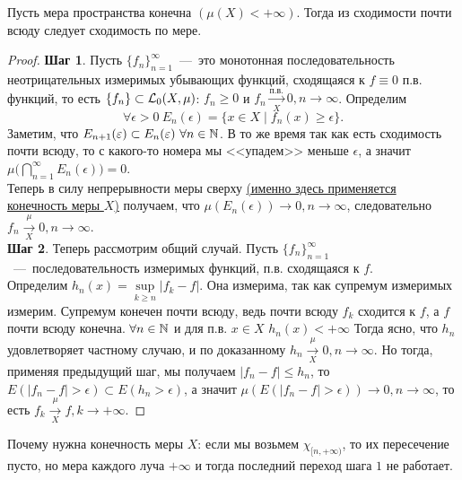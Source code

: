 \begin{theorem}[Лебега]
    Пусть мера пространства конечна $\left(\mu (X) < +\infty\right)$. Тогда из сходимости почти всюду следует сходимость по мере.
\end{theorem}
\begin{proof}
     \textbf{Шаг 1}. Пусть $\{f_n\}_{n = 1}^\infty$~---~это монотонная последовательность неотрицательных измеримых убывающих функций, сходящаяся к $f \equiv 0$ п.в. функций, то есть $\{ f_n \} \subset \mathcal{L}_0 (X, \mu)$: $f_n \geq 0$ и $f_n \xrightarrow[X]{\text{п.в.}}0, n \xrightarrow{} \infty$.
     Определим $$\forall \epsilon > 0 \ E_n(\epsilon) = \{x \in X \mid f_n(x) \geq \epsilon\}.$$ Заметим, что $E_{n + 1}(\varepsilon) \subset E_n(\varepsilon)\  \forall n \in \mathbb{N}$. В то же время так как есть сходимость почти всюду, то с какого-то номера мы <<упадем>> меньше $\epsilon$, а значит $\mu \Big(\bigcap\limits_{n = 1}^\infty E_n(\epsilon) \Big) = 0$.\\
     Теперь в силу непрерывности меры сверху \hyperlink{upper_continious}{(именно здесь применяется конечность меры $X$)} получаем, что $\mu(E_n(\epsilon)) \rightarrow 0, n \rightarrow \infty$, следовательно $f_n \xrightarrow[X]{\mu} 0, n \rightarrow \infty$. \\
    \textbf{Шаг 2}. Теперь рассмотрим общий случай. Пусть $\{f_n\}_{n = 1}^\infty$~---~последовательность измеримых функций, п.в. сходящаяся к $f$. \\
    Определим $h_n(x ) = \sup\limits_{k \geq n} |f_k - f|$. Она измерима, так как супремум измеримых измерим. Супремум конечен почти всюду, ведь почти всюду $f_k$ сходится к $f$, а $f$ почти всюду конечна. $\forall n \in \mathbb{N}$  и для п.в. $x \in X$ $h_n (x) < +\infty$
    Тогда ясно, что $h_n$ удовлетворяет частному случаю, и по доказанному $h_n \xrightarrow[X]{\mu} 0, n \rightarrow \infty$. Но тогда, применяя предыдущий шаг, мы получаем  $|f_n - f| \leq h_n$, то $E(|f_n - f| > \epsilon) \subset E(h_n > \epsilon)$, а значит $\mu(E(|f_n - f| > \epsilon)) \rightarrow 0, n \rightarrow \infty$, то есть $f_k \xrightarrow[X]{\mu} f, k \rightarrow +\infty$.
\end{proof}

\begin{remark}
    Почему нужна конечность меры $X$: если мы возьмем $\chi_{[n, +\infty)}$, то их пересечение пусто, но мера каждого луча $+\infty$ и тогда последний переход шага $1$ не работает.
\end{remark}